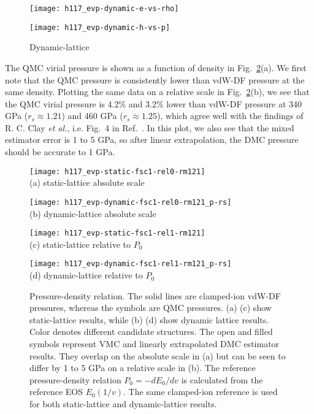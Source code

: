 \begin{figure}[h]
\begin{minipage}{0.49\textwidth}
\texttt{[image: h117\_evp-dynamic-e-vs-rho]}
\end{minipage}
\begin{minipage}{0.49\textwidth}
\texttt{[image: h117\_evp-dynamic-h-vs-p]}
\end{minipage}
\caption{Dynamic-lattice \label{fig:dynamic-qmc-vs-drummond}}
\end{figure}

The QMC virial pressure is shown as a function of density in Fig.~\ref{fig:hsolid-p-vs-n}(a).
We first note that the QMC pressure is consistently lower than vdW-DF pressure at the same density.
Plotting the same data on a relative scale in Fig.~\ref{fig:hsolid-p-vs-n}(b),
we see that the QMC virial pressure is 4.2\% and 3.2\% lower than vdW-DF pressure at 340 GPa ($r_s\approx 1.21$) and 460 GPa ($r_s\approx 1.25$), which agree well with the findings of R. C. Clay \textit{et al.}, i.e. Fig.~4 in Ref.~\cite{Clay2016}.
In this plot, we also see that the mixed estimator error is 1 to 5 GPa, so after linear extrapolation, the DMC pressure should be accurate to 1 GPa.

\begin{figure}[h]
\centering
\begin{minipage}{0.49\textwidth}
\centering
\texttt{[image: h117\_evp-static-fsc1-rel0-rm121]}\\
(a) static-lattice absolute scale
\end{minipage}
\begin{minipage}{0.49\textwidth}
\centering
\texttt{[image: h117\_evp-dynamic-fsc1-rel0-rm121\_p-rs]}\\
(b) dynamic-lattice absolute scale
\end{minipage}
\begin{minipage}{0.49\textwidth}
\centering
\texttt{[image: h117\_evp-static-fsc1-rel1-rm121]}\\
(c) static-lattice relative to $P_0$
\end{minipage}
\begin{minipage}{0.49\textwidth}
\centering
\texttt{[image: h117\_evp-dynamic-fsc1-rel1-rm121\_p-rs]}\\
(d) dynamic-lattice relative to $P_0$
\end{minipage}
\caption{Pressure-density relation. The solid lines are clamped-ion vdW-DF pressures, whereas the symbols are QMC pressures. (a) (c) show static-lattice results, while (b) (d) show dynamic lattice results. Color denotes different candidate structures. The open and filled symbols represent VMC and linearly extrapolated DMC estimator results. They overlap on the absolute scale in (a) but can be seen to differ by 1 to 5 GPa on a relative scale in (b). The reference pressure-density relation $P_0=-dE_0/dv$ is calculated from the reference EOS $E_0(1/v)$. The same clamped-ion reference is used for both static-lattice and dynamic-lattice results.}
\label{fig:hsolid-p-vs-n}
\end{figure}

